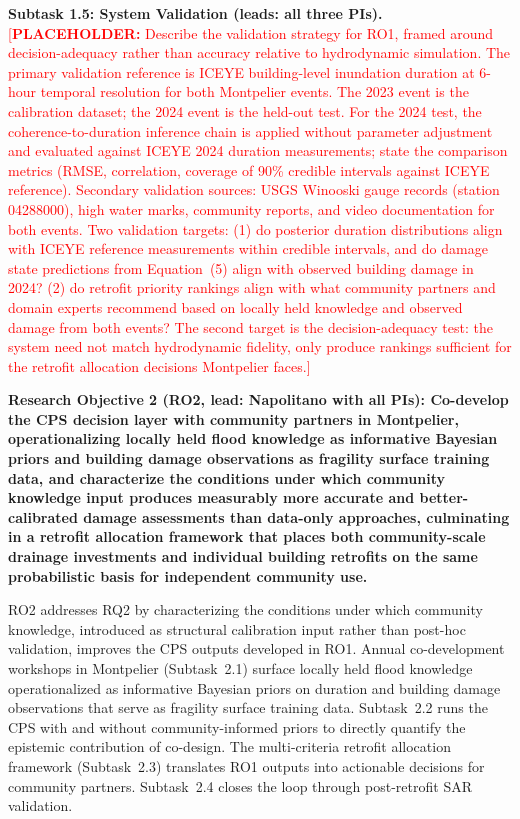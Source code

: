 \documentclass[11pt]{article}
\newcommand{\placeholder}[1]{\textcolor{red}{[\textbf{PLACEHOLDER:} #1]}}
\begin{document}
\textbf{Subtask 1.5: System Validation (leads: all three PIs).}
\placeholder{Describe the validation strategy for RO1, framed around decision-adequacy rather than accuracy relative to hydrodynamic simulation. The primary validation reference is ICEYE building-level inundation duration at 6-hour temporal resolution for both Montpelier events. The 2023 event is the calibration dataset; the 2024 event is the held-out test. For the 2024 test, the coherence-to-duration inference chain is applied without parameter adjustment and evaluated against ICEYE 2024 duration measurements; state the comparison metrics (RMSE, correlation, coverage of 90\% credible intervals against ICEYE reference). Secondary validation sources: USGS Winooski gauge records (station 04288000), high water marks, community reports, and video documentation for both events. Two validation targets: (1) do posterior duration distributions align with ICEYE reference measurements within credible intervals, and do damage state predictions from Equation~(5) align with observed building damage in 2024? (2) do retrofit priority rankings align with what community partners and domain experts recommend based on locally held knowledge and observed damage from both events? The second target is the decision-adequacy test: the system need not match hydrodynamic fidelity, only produce rankings sufficient for the retrofit allocation decisions Montpelier faces.}

\vspace{5pt}
\begin{tcolorbox}[colback=mycmykcolor,colframe=black,boxrule=1pt,coltext=black,
  left=1mm,right=1mm,top=1mm,bottom=1mm]
\textbf{Research Objective 2 (RO2, lead: Napolitano with all PIs): Co-develop the CPS decision layer with community partners in Montpelier, operationalizing locally held flood knowledge as informative Bayesian priors and building damage observations as fragility surface training data, and characterize the conditions under which community knowledge input produces measurably more accurate and better-calibrated damage assessments than data-only approaches, culminating in a retrofit allocation framework that places both community-scale drainage investments and individual building retrofits on the same probabilistic basis for independent community use.}
\end{tcolorbox}

RO2 addresses RQ2 by characterizing the conditions under which community knowledge, introduced as structural calibration input rather than post-hoc validation, improves the CPS outputs developed in RO1.
Annual co-development workshops in Montpelier (Subtask~2.1) surface locally held flood knowledge operationalized as informative Bayesian priors on duration and building damage observations that serve as fragility surface training data.
Subtask~2.2 runs the CPS with and without community-informed priors to directly quantify the epistemic contribution of co-design.
The multi-criteria retrofit allocation framework (Subtask~2.3) translates RO1 outputs into actionable decisions for community partners.
Subtask~2.4 closes the loop through post-retrofit SAR validation.
\end{document}
